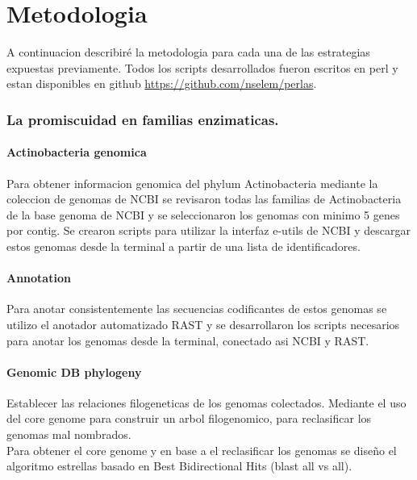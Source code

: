 \documentclass[12pt,twoside]{reedthesis}
\begin{document}
  \clearpage  
  
  \chapter*{Metodologia}\label{metodologia}
  
  A continuacion describiré la metodologia para cada una de las
  estrategias expuestas previamente. Todos los scripts desarrollados
  fueron escritos en perl y estan disponibles en github
  \url{https://github.com/nselem/perlas}.
  
  \subsection{La promiscuidad en familias
  enzimaticas.}\label{la-promiscuidad-en-familias-enzimaticas.-1}
  
  \subsubsection{Actinobacteria genomica}\label{actinobacteria-genomica}
  
  Para obtener informacion genomica del phylum Actinobacteria mediante la
  coleccion de genomas de NCBI se revisaron todas las familias de
  Actinobacteria de la base genoma de NCBI y se seleccionaron los genomas
  con minimo 5 genes por contig. Se crearon scripts para utilizar la
  interfaz e-utils de NCBI y descargar estos genomas desde la terminal a
  partir de una lista de identificadores.
  
  \subsubsection{Annotation}\label{annotation}
  
  Para anotar consistentemente las secuencias codificantes de estos
  genomas se utilizo el anotador automatizado RAST y se desarrollaron los
  scripts necesarios para anotar los genomas desde la terminal, conectado
  asi NCBI y RAST.
  
  \subsubsection{Genomic DB phylogeny}\label{genomic-db-phylogeny}
  
  Establecer las relaciones filogeneticas de los genomas colectados.
  Mediante el uso del core genome para construir un arbol filogenomico,
  para reclasificar los genomas mal nombrados.\\
  Para obtener el core genome y en base a el reclasificar los genomas se
  diseño el algoritmo estrellas basado en Best Bidirectional Hits (blast
  all vs all).
  
\end{document}
